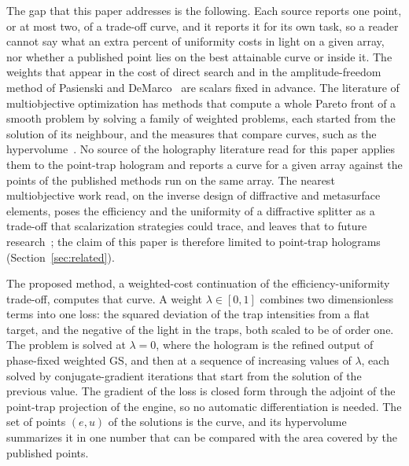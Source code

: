 The gap that this paper addresses is the following. Each source reports one point, or at most two, of a trade-off curve, and it reports it for its own task, so a reader cannot say what an extra percent of uniformity costs in light on a given array, nor whether
a published point lies on the best attainable curve or inside it. The weights that appear in the cost of direct search and in the amplitude-freedom method of Pasienski and DeMarco~\cite{pasienski} are scalars fixed in advance. The
literature of multiobjective optimization has methods that compute a whole Pareto front of a smooth problem by solving a family of weighted problems, each started from the solution of its neighbour, and the measures that compare curves, such as the hypervolume~\cite{zitzler2003,beume}.
No source of the holography literature read for this paper applies them to the point-trap hologram and reports a curve for a given array against the points of the published methods run on the same array. The nearest multiobjective work read, on the inverse design of diffractive and metasurface elements, poses the efficiency and the uniformity of a diffractive splitter as a trade-off that scalarization strategies could trace, and leaves that to future research~\cite{invrsgym}; the claim of this paper is therefore limited to point-trap holograms (Section~\ref{sec:related}).

The proposed method, a weighted-cost continuation of the efficiency-uniformity trade-off, computes that curve. A weight $\lambda\in[0,1]$ combines two dimensionless terms into one loss: the squared deviation of the trap intensities from a flat target, and the negative of the light in the traps, both scaled to be of order one.
The problem is solved at $\lambda=0$, where the hologram is the refined output of phase-fixed weighted GS, and then at a sequence of increasing values of $\lambda$, each solved by conjugate-gradient iterations that start from the solution of the previous value. The gradient of the loss is closed form through the adjoint of the point-trap projection of the engine, so no automatic differentiation is needed. The set of points
$(e,u)$ of the solutions is the curve, and its hypervolume summarizes it in one number that can be compared with the area covered by the published points.

